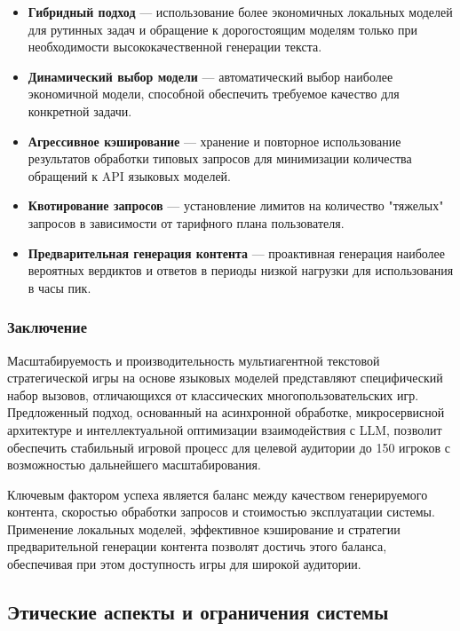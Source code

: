 \begin{itemize}
    \item \textbf{Гибридный подход} — использование более экономичных локальных моделей для рутинных задач и обращение к дорогостоящим моделям только при необходимости высококачественной генерации текста.

    \item \textbf{Динамический выбор модели} — автоматический выбор наиболее экономичной модели, способной обеспечить требуемое качество для конкретной задачи.

    \item \textbf{Агрессивное кэширование} — хранение и повторное использование результатов обработки типовых запросов для минимизации количества обращений к API языковых моделей.

    \item \textbf{Квотирование запросов} — установление лимитов на количество "{}тяжелых"{} запросов в зависимости от тарифного плана пользователя.

    \item \textbf{Предварительная генерация контента} — проактивная генерация наиболее вероятных вердиктов и ответов в периоды низкой нагрузки для использования в часы пик.
\end{itemize}

\subsubsection{Заключение}

Масштабируемость и производительность мультиагентной текстовой стратегической игры на основе языковых моделей представляют специфический набор вызовов, отличающихся от классических многопользовательских игр. Предложенный подход, основанный на асинхронной обработке, микросервисной архитектуре и интеллектуальной оптимизации взаимодействия с LLM, позволит обеспечить стабильный игровой процесс для целевой аудитории до 150 игроков с возможностью дальнейшего масштабирования.

Ключевым фактором успеха является баланс между качеством генерируемого контента, скоростью обработки запросов и стоимостью эксплуатации системы. Применение локальных моделей, эффективное кэширование и стратегии предварительной генерации контента позволят достичь этого баланса, обеспечивая при этом доступность игры для широкой аудитории.

\subsection{Этические аспекты и ограничения системы}

